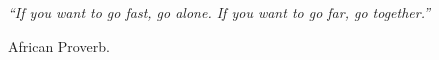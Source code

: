 \documentclass[a4paper, 13pt, oneside]{Thesis}  %
\begin{document}
\clearpage  %


\pagestyle{empty}  %

\null\vfill
\textit{``If you want to go fast, go alone. If you want to go far, go together.''}

\begin{flushright}
African Proverb.
\end{flushright}

\vfill\vfill\vfill\vfill\vfill\vfill\null
\clearpage  %

\mainmatter	  %
\pagestyle{fancy}  %








\end{document}
